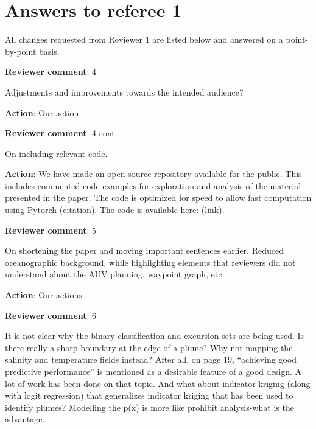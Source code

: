 \documentclass[a4paper]{article}
\newcounter{reviewer}
\def\revcom{\textbf{Reviewer comment}}
\def\action{\textbf{Action}}
\newcommand{\frevcomment}[1]{{\color{blue}{\{Rev 1: #1\}}}}
\begin{document}
\section*{Answers to referee 1}
All changes requested from Reviewer 1 are listed below and answered on a point-by-point basis.

\setcounter{reviewer}{1}

\begin{answers}

\item{\revcom:  4}\label{r1c4}

Adjustments and improvements towards the intended audience?

\action: Our action



\item{\revcom: 4 cont.}\label{r1c4}

On including relevant code.

\action: We have made an open-source repository available for the public. This includes commented code examples for exploration and analysis of the material presented in the paper. The code is optimized for speed to allow fast computation using Pytorch (citation). The code is available here: (link). 

\item{\revcom: 5}\label{r1c5}

On shortening the paper and moving important sentences earlier. Reduced oceanographic background, while highlighting elements that reviewers did not understand about the AUV planning, waypoint graph, etc.

\action: Our actions

\item{\revcom: 6}\label{r1c6}

It is not clear why the binary classification and excursion sets are being used. Is there really a sharp boundary at the edge of a plume? Why not mapping the salinity and temperature fields instead? After all, on page 19, “achieving good predictive performance” is mentioned as a desirable feature of a good design. A lot of work has been done on that topic. And what about indicator kriging (along with logit regression) that generalizes indicator kriging that has been used to identify plumes? Modelling the p(x) is more like prohibit analysis-what is the advantage.


\end{answers}
\end{document}
